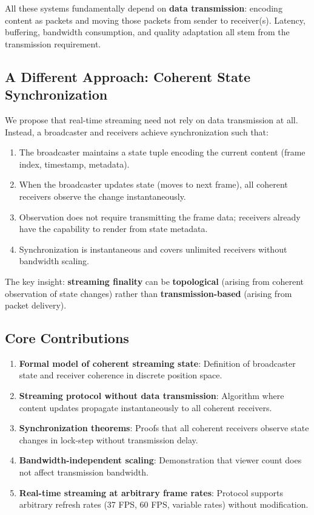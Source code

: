 \documentclass[twocolumn,10pt,a4paper]{article}
\theoremstyle{plain}
\theoremstyle{definition}
\begin{document}
All these systems fundamentally depend on \textbf{data transmission}: encoding content as packets and moving those packets from sender to receiver(s). Latency, buffering, bandwidth consumption, and quality adaptation all stem from the transmission requirement.

\subsection{A Different Approach: Coherent State Synchronization}

We propose that real-time streaming need not rely on data transmission at all. Instead, a broadcaster and receivers achieve synchronization such that:

\begin{enumerate}
\item The broadcaster maintains a state tuple encoding the current content (frame index, timestamp, metadata).
\item When the broadcaster updates state (moves to next frame), all coherent receivers observe the change instantaneously.
\item Observation does not require transmitting the frame data; receivers already have the capability to render from state metadata.
\item Synchronization is instantaneous and covers unlimited receivers without bandwidth scaling.
\end{enumerate}

The key insight: \textbf{streaming finality} can be \textbf{topological} (arising from coherent observation of state changes) rather than \textbf{transmission-based} (arising from packet delivery).

\subsection{Core Contributions}

\begin{enumerate}
\item \textbf{Formal model of coherent streaming state}: Definition of broadcaster state and receiver coherence in discrete position space.

\item \textbf{Streaming protocol without data transmission}: Algorithm where content updates propagate instantaneously to all coherent receivers.

\item \textbf{Synchronization theorems}: Proofs that all coherent receivers observe state changes in lock-step without transmission delay.

\item \textbf{Bandwidth-independent scaling}: Demonstration that viewer count does not affect transmission bandwidth.

\item \textbf{Real-time streaming at arbitrary frame rates}: Protocol supports arbitrary refresh rates (37 FPS, 60 FPS, variable rates) without modification.
\end{enumerate}
\end{document}
